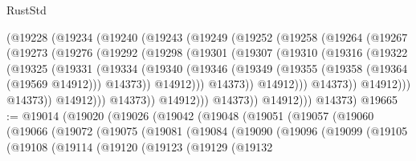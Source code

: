 \begin{lexlean}{RustStd}
\begin{coremodule}
                (@19228
                  (@19234
                    (@19240
                      (@19243
                        (@19249
                          (@19252
                            (@19258
                              (@19264
                                (@19267
                                  (@19273
                                    (@19276
                                      (@19292
                                        (@19298
                                          (@19301
                                            (@19307
                                              (@19310
                                                (@19316
                                                  (@19322
                                                    (@19325
                                                      (@19331
                                                        (@19334
                                                          (@19340
                                                            (@19346
                                                              (@19349
                                                                (@19355
                                                                  (@19358 (@19364 (@19569 @14912)))
                                                                  @14373))
                                                              @14912)))
                                                        @14373))
                                                    @14912)))
                                              @14373))
                                          @14912)))
                                    @14373))
                                @14912)))
                          @14373))
                      @14912)))
                @14373))
            @14912)))
      @14373)
@19665 := @19014
    (@19020
      (@19026
        (@19042
          (@19048
            (@19051
              (@19057
                (@19060
                  (@19066
                    (@19072
                      (@19075
                        (@19081
                          (@19084
                            (@19090
                              (@19096
                                (@19099
                                  (@19105
                                    (@19108
                                      (@19114
                                        (@19120
                                          (@19123
                                            (@19129
                                              (@19132

\end{coremodule}
\end{lexlean}
